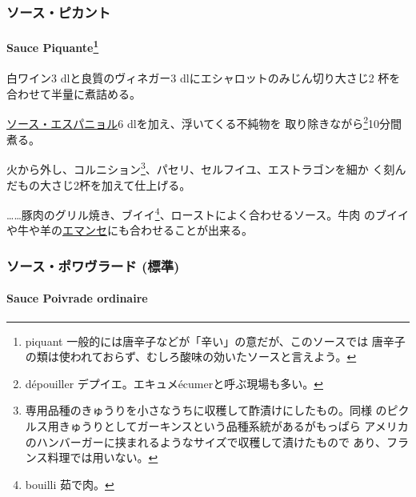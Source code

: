 \begin{recette}
\maeaki

\hypertarget{ux30bdux30fcux30b9ux30d4ux30abux30f3ux30c8}{%
\subsubsection{ソース・ピカント}\label{ux30bdux30fcux30b9ux30d4ux30abux30f3ux30c8}}

\hypertarget{sauce-piquante}{%
\paragraph[Sauce Piquante]{\texorpdfstring{Sauce Piquante\footnote{piquant
  一般的には唐辛子などが「辛い」の意だが、このソースでは
  唐辛子の類は使われておらず、むしろ酸味の効いたソースと言えよう。}}{Sauce Piquante}}\label{sauce-piquante}}


白ワイン3 dlと良質のヴィネガー3 dlにエシャロットのみじん切り大さじ2
\undemi{}杯を合わせて半量に煮詰める。

\protect\hyperlink{sauce-espagnole}{ソース・エスパニョル}6
dlを加え、浮いてくる不純物を 取り除きながら\footnote{dépouiller
  デプイエ。エキュメécumerと呼ぶ現場も多い。}10分間煮る。

火から外し、コルニション\footnote{専用品種のきゅうりを小さなうちに収穫して酢漬けにしたもの。同様
  のピクルス用きゅうりとしてガーキンスという品種系統があるがもっぱら
  アメリカのハンバーガーに挟まれるようなサイズで収穫して漬けたもので
  あり、フランス料理では用いない。}、パセリ、セルフイユ、エストラゴンを細か
く刻んだもの大さじ2杯を加えて仕上げる。

\ldots{}\ldots{}豚肉のグリル焼き、ブイイ\footnote{bouilli 茹で肉。}、ローストによく合わせるソース。牛肉
のブイイや牛や羊の\href{}{エマンセ}にも合わせることが出来る。

\maeaki

\hypertarget{ux30bdux30fcux30b9ux30ddux30efux30f4ux30e9ux30fcux30c9-ux6a19ux6e96}{%
\subsubsection{ソース・ポワヴラード
(標準)}\label{ux30bdux30fcux30b9ux30ddux30efux30f4ux30e9ux30fcux30c9-ux6a19ux6e96}}

\hypertarget{sauce-poivrade}{%
\paragraph{Sauce Poivrade ordinaire}\label{sauce-poivrade}}


\end{recette}
